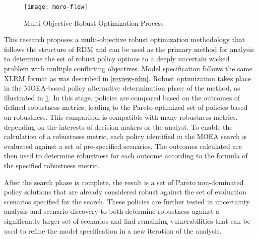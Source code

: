     \begin{figure}[ht]
        \centering
        \captionsetup{justification=centering}
        
        \texttt{[image: moro-flow]}
        \caption{Multi-Objective Robust Optimization Process}
        \label{fig:moro-flow}
    \end{figure}
    
    This research proposes a multi-objective robust optimization methodology that follows the structure of RDM and can be used as the primary method for analysis to determine the set of robust policy options to a deeply uncertain wicked problem with multiple conflicting objectives. Model specification follows the same XLRM format as was described in \cref{review-rdm}. Robust optimization takes place in the MOEA-based policy alternative determination phase of the method, as illustrated in \cref{fig:moro-flow}. In this stage, policies are compared based on the outcomes of defined robustness metrics, leading to the Pareto optimized set of policies based on robustness. This comparison is compatible with many robustness metrics, depending on the interests of decision makers or the analyst. To enable the calculation of a robustness metric, each policy identified in the MOEA search is evaluated against a set of pre-specified scenarios. The outcomes calculated are then used to determine robustness for each outcome according to the formula of the specified robustness metric. 

    
    After the search phase is complete, the result is a set of Pareto non-dominated policy solutions that are already considered robust against the set of evaluation scenarios specified for the search. These policies are further tested in uncertainty analysis and scenario discovery to both determine robustness against a significantly larger set of scenarios and find remaining vulnerabilities that can be used to refine the model specification in a new iteration of the analysis. 

